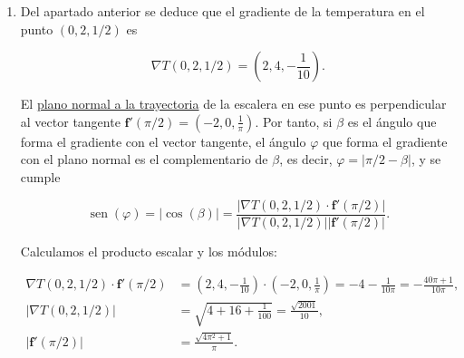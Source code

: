 \documentclass[
  spanish,
  a4paper,
]{scrreport}
\theoremstyle{definition}
\theoremstyle{remark}
\begin{document}
\begin{tcolorbox}
\begin{enumerate}
  y sustituyendo los valores del apartado anterior, las tasas de
  variación instantánea de la temperatura con respecto a los ejes \(x\)
  e \(y\) en el punto \((0,2,1/2)\) son

  \begin{align*}
  \frac{\partial T}{\partial x}(0,2,1/2) &= \cos(\pi/2)\cdot 4 - \frac{\operatorname{sen}(\pi/2)}{2}(-4) = 2\ ^\circ\mathrm{C/m}, \\
  \frac{\partial T}{\partial y}(0,2,1/2) &= \operatorname{sen}(\pi/2)\cdot 4 + \frac{\cos(\pi/2)}{2}(-4) = 4\ ^\circ\mathrm{C/m}.
  \end{align*}

  Este resultado es coherente con el apartado anterior, ya que en el
  punto \((0,2,1/2)\) la dirección radial es la del eje \(y\) positivo y
  la dirección angular la del eje \(x\) negativo.

  También podríamos obtenerlo pasando \(T\) a coordenadas cartesianas,
  \(T(x,y,z) = 20 + x^2 + y^2 + x\sqrt{x^2+y^2} - \frac{z}{10}\), y
  derivando directamente, aunque los cálculos son más largos.
\item
  Del apartado anterior se deduce que el gradiente de la temperatura en
  el punto \((0,2,1/2)\) es

  \[
  \nabla T(0, 2, 1/2) = \left(2, 4, -\frac{1}{10}\right).
  \]

  El
  \href{https://aprendeconalf.es/analisis-manual/12-funciones-vectoriales.html\#def-plano-normal-trayectoria-espacio}{plano
  normal a la trayectoria} de la escalera en ese punto es perpendicular
  al vector tangente
  \(\mathbf{f}'(\pi/2) = \left(-2, 0, \frac{1}{\pi}\right)\). Por tanto,
  si \(\beta\) es el ángulo que forma el gradiente con el vector
  tangente, el ángulo \(\varphi\) que forma el gradiente con el plano
  normal es el complementario de \(\beta\), es decir,
  \(\varphi = |\pi/2 - \beta|\), y se cumple

  \[
  \operatorname{sen}(\varphi) = |\cos(\beta)| = \frac{|\nabla T(0,2,1/2)\cdot \mathbf{f}'(\pi/2)|}{|\nabla T(0,2,1/2)||\mathbf{f}'(\pi/2)|}.
  \]

  Calculamos el producto escalar y los módulos:

  \begin{align*}
  \nabla T(0,2,1/2)\cdot \mathbf{f}'(\pi/2) &= \left(2, 4, -\frac{1}{10}\right)\cdot\left(-2, 0, \frac{1}{\pi}\right) = -4 - \frac{1}{10\pi} = -\frac{40\pi+1}{10\pi},\\
  |\nabla T(0,2,1/2)| &= \sqrt{4 + 16 + \frac{1}{100}} = \frac{\sqrt{2001}}{10},\\
  |\mathbf{f}'(\pi/2)| &= \frac{\sqrt{4\pi^2+1}}{\pi}.
  \end{align*}


\end{enumerate}
\end{tcolorbox}
\end{document}
